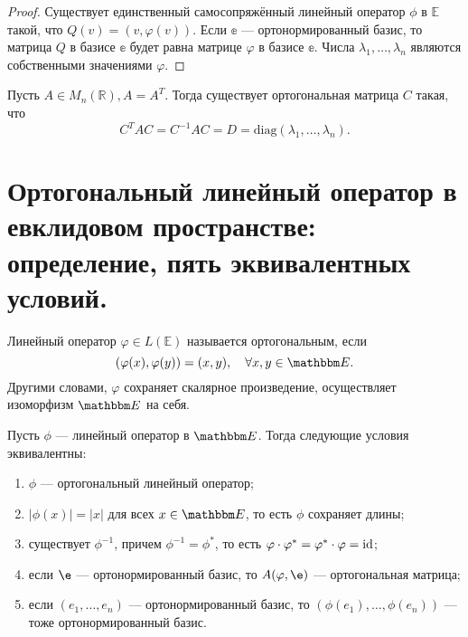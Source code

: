\begin{proof}
	Существует единственный самосопряжённый линейный оператор $\phi$ в $\mathbb{E}$ такой, что $Q(v) = (v, \varphi(v))$. Если $\mathbb{e}$ --- ортонормированный базис, то матрица $Q$ в базисе $\mathbb{e}$ будет равна матрице $\varphi$ в базисе $\mathbb{e}$. Числа $\lambda_1, \ldots, \lambda_n$ являются собственными значениями $\varphi$. 
\end{proof}

\begin{Consequence}
	Пусть $A\in M_n(\mathbb{R}), A = A^T$. Тогда существует ортогональная матрица $C$ такая, что 
	$$
	C^TAC = C^{-1} AC = D = \mathrm{diag}(\lambda_1, \ldots, \lambda_n).
	$$
\end{Consequence}

\section{Ортогональный линейный оператор в евклидовом пространстве: определение, пять эквивалентных условий.}

\begin{Def}
	Линейный оператор $\varphi \in L(\mathbb{E})$ называется ортогональным, если
	$$
	(\varphi(x), \varphi(y)) = (x,y), \quad \forall x, y \in \E.
	$$
	Другими словами, $\varphi$ сохраняет скалярное произведение, осуществляет изоморфизм $\E$ на себя.
\end{Def}

\begin{Suggestion}
Пусть $\phi$ --- линейный оператор в $\E$. Тогда следующие условия эквивалентны:
\begin{enumerate}
\item $\phi$ --- ортогональный линейный оператор;
\item $|\phi(x)| = |x|$ для всех $x \in \E$, то есть $\phi$ сохраняет длины;
\item существует $\phi^{-1}$, причем $\phi^{-1} = \phi^*$, то есть $\varphi \cdot \varphi^* = \varphi^*\cdot \varphi = \mathrm{id}$;
\item если $\e$ --- ортонормированный базис, то $A(\phi, \e)$ --- ортогональная матрица;
\item если $(e_1, \ldots, e_n)$ --- ортонормированный базис, то $(\phi(e_1), \ldots, \phi(e_n))$ --- тоже ортонормированный базис.
\end{enumerate}
\end{Suggestion}

